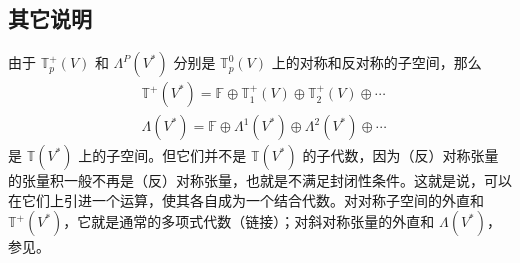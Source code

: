 \subsection{其它说明}
由于 $\mathbb T_p^+(V)$ 和 $\Lambda^P(V^*)$ 分别是 $\mathbb T_p^0(V)$ 上的对称和反对称的子空间，那么
\begin{equation}
\begin{aligned}
&\mathbb T^+(V^*)=\mathbb F\oplus\mathbb T_1^+(V)\oplus\mathbb T_2^+(V)\oplus\cdots\\
&\Lambda(V^*)=\mathbb F\oplus \Lambda^1(V^*)\oplus\Lambda^2(V^*)\oplus\cdots
\end{aligned}~
\end{equation}
是 $\mathbb T(V^*)$ 上的子空间。但它们并不是 $\mathbb T(V^*)$ 的子代数，因为（反）对称张量的张量积一般不再是（反）对称张量，也就是不满足封闭性条件。这就是说，可以在它们上引进一个运算，使其各自成为一个结合代数。对对称子空间的外直和 $\mathbb T^+(V^*)$，它就是通常的多项式代数（链接）；对斜对称张量的外直和 $\Lambda(V^*)$，参见。
